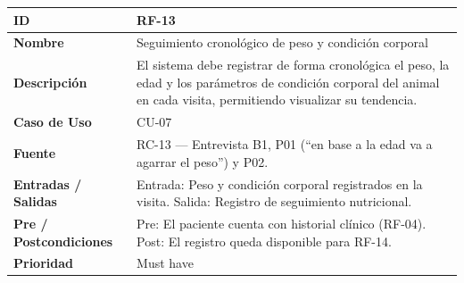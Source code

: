 \documentclass[
]{article}
\newcounter{none} %
\begin{document}
{\def\LTcaptype{none} %
\begin{longtable}[]{|
  >{\raggedright\arraybackslash}p{}|
  >{\raggedright\arraybackslash}p{}|}
\hline
\begin{minipage}[b]{\linewidth}\raggedright
\textbf{ID}
\end{minipage} & \begin{minipage}[b]{\linewidth}\raggedright
RF-13
\end{minipage} \\
\hline
\endhead
\hline
\endlastfoot
\textbf{Nombre} & \begin{minipage}[t]{\linewidth}\raggedright
Seguimiento cronológico de peso y condición corporal
\end{minipage} \\
\hline
\textbf{Descripción} & \begin{minipage}[t]{\linewidth}\raggedright
El sistema debe registrar de forma cronológica el peso, la edad y los parámetros de condición corporal del animal en cada visita, permitiendo visualizar su tendencia.
\end{minipage} \\
\hline
\textbf{Caso de Uso} & \begin{minipage}[t]{\linewidth}\raggedright
CU-07
\end{minipage} \\
\hline
\textbf{Fuente} & \begin{minipage}[t]{\linewidth}\raggedright
RC-13 — Entrevista B1, P01 (“en base a la edad va a agarrar el peso”) y P02.
\end{minipage} \\
\hline
\textbf{Entradas / Salidas} & \begin{minipage}[t]{\linewidth}\raggedright
Entrada: Peso y condición corporal registrados en la visita. Salida: Registro de seguimiento nutricional.
\end{minipage} \\
\hline
\textbf{Pre / Postcondiciones} & \begin{minipage}[t]{\linewidth}\raggedright
Pre: El paciente cuenta con historial clínico (RF-04). Post: El registro queda disponible para RF-14.
\end{minipage} \\
\hline
\textbf{Prioridad} & \begin{minipage}[t]{\linewidth}\raggedright
Must have
\end{minipage} \\

\end{longtable}}
\end{document}
